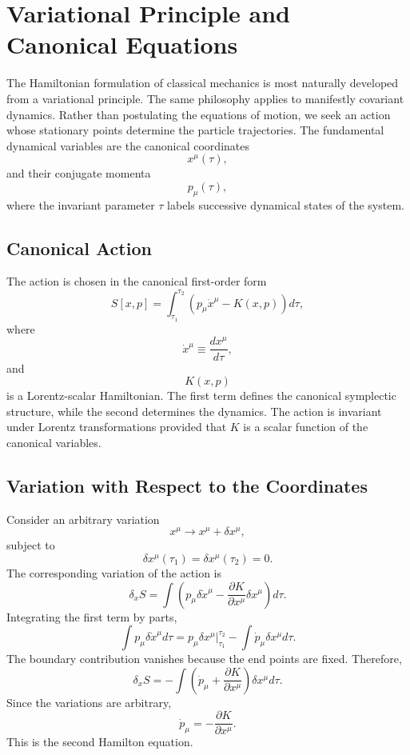 \section{Variational Principle and Canonical Equations}
The Hamiltonian formulation of classical mechanics is most naturally
developed from a variational principle. The same philosophy applies to
manifestly covariant dynamics. Rather than postulating the equations of
motion, we seek an action whose stationary points determine the particle
trajectories.
The fundamental dynamical variables are the canonical coordinates
\[x^\mu(\tau),\]
and their conjugate momenta
\[p_\mu(\tau),\]
where the invariant parameter \(\tau\) labels successive dynamical
states of the system.
\subsection{Canonical Action}
The action is chosen in the canonical first-order form
\[\boxed{S[x,p]=\int_{\tau_1}^{\tau_2}\left(p_\mu \dot x^\mu-K(x,p)\right)d\tau ,}\]
where
\[\dot x^\mu\equiv\frac{dx^\mu}{d\tau},\]
and
\[K(x,p)\]
is a Lorentz-scalar Hamiltonian.
The first term defines the canonical symplectic structure, while the
second determines the dynamics.
The action is invariant under Lorentz transformations provided that
\(K\) is a scalar function of the canonical variables.
\subsection{Variation with Respect to the Coordinates}
Consider an arbitrary variation
\[x^\mu\rightarrow x^\mu+\delta x^\mu,\]
subject to
\[\delta x^\mu(\tau_1)=\delta x^\mu(\tau_2)=0.\]
The corresponding variation of the action is
\[\delta_x S=\int\left(p_\mu\delta\dot x^\mu-\frac{\partial K}{\partial x^\mu}
\delta x^\mu\right)d\tau .\]
Integrating the first term by parts,
\[\int p_\mu\delta\dot x^\mu d\tau=p_\mu\delta x^\mu|_{\tau_1}^{\tau_2}
-\int\dot p_\mu\delta x^\mu d\tau .\]
The boundary contribution vanishes because the end points are fixed.
Therefore,
\[\delta_x S=-\int\left(\dot p_\mu+\frac{\partial K}{\partial x^\mu}\right)
\delta x^\mu d\tau .\]
Since the variations are arbitrary,
\[\boxed{\dot p_\mu=-\frac{\partial K}{\partial x^\mu}.}\]
This is the second Hamilton equation.

